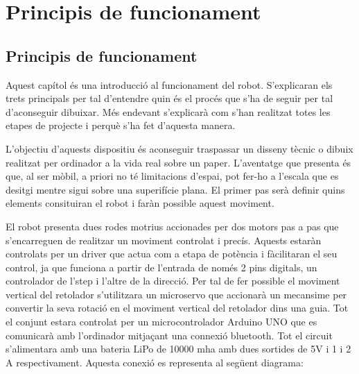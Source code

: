 \setlength\topmargin{8mm}
\onehalfspacing
\chapter{Principis de funcionament} %

\label{Chapter2} %





\section{Principis de funcionament}

Aquest capítol és una introducció al funcionament del robot. S'explicaran els trets principals per tal d'entendre quin és el procés que s'ha de seguir per tal d'aconseguir dibuixar. Més endevant s'explicarà com s'han realitzat totes les etapes de projecte i perquè s'ha fet d'aquesta manera. 

L'objectiu d'aquests dispositiu és aconseguir traspassar un disseny tècnic o dibuix realitzat per ordinador a la vida real sobre un paper. L'aventatge que presenta és que, al ser mòbil, a priori no té limitacions d'espai, pot fer-ho a l'escala que es desitgi mentre sigui sobre una superifície plana. El primer pas serà definir quins elements consituiran el robot i faràn possible aquest moviment. 

El robot presenta dues rodes motrius accionades per dos motors pas a pas que s'encarreguen de realitzar un moviment controlat i precís. Aquests estaràn controlats per un driver que actua com a etapa de potència i fàcilitaran el seu control, ja que funciona a partir de l'entrada de només 2 pins digitals, un controlador de l'step i l'altre de la direcció. Per tal de fer possible el moviment vertical del retolador s'utilitzara un microservo que accionarà un mecansime per convertir la seva rotació en el moviment vertical del retolador dins una guia. Tot el conjunt estara controlat per un microcontrolador Arduino UNO que es comunicarà amb l'ordinador mitjaçant una connexió bluetooth. Tot el circuit s'alimentara amb una bateria LiPo de 10000 mha amb dues sortides de 5V i 1 i 2 A respectivament. Aquesta conexió es representa al següent diagrama:

